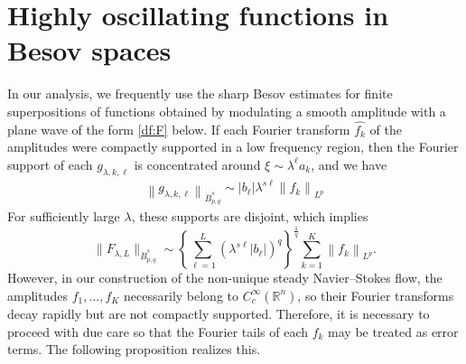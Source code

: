 \documentclass[a4paper,12pt,reqno]{amsart}
\theoremstyle{plain}
\theoremstyle{definition}
\newcommand{\dB}{\dot{B}}
\newcommand{\n}[1]{{\left\|#1\right\|}}
\newcommand{\Mp}[1]{\left\{#1\right\}}
\renewcommand{\sp}[1]{\left(#1\right)}
\begin{document}
\section{Highly oscillating functions in Besov spaces}\label{sec:osc}
In our analysis, we frequently use the sharp Besov estimates for finite superpositions of functions obtained by
modulating a smooth amplitude with a plane wave of the form \eqref{df:F} below.
If each Fourier transform $\widehat{f_k}$ of the amplitudes were compactly supported in a low frequency region, then the Fourier support of each $g_{\lambda,k,\ell}$ is concentrated around $\xi \sim \lambda^\ell a_k$, and we have 
\begin{align}
    \n{g_{\lambda,k,\ell}}_{\dB_{p,q}^s} \sim |b_\ell|\lambda^{s\ell}\n{f_k}_{L^p}
\end{align}
For sufficiently large $\lambda$,
these supports are disjoint,
which implies
\begin{equation}\label{eq:heuristic-superposition}
  \|F_{\lambda,L}\|_{\dot B^{s}_{p,q}}
  \sim
  \Mp{\sum_{\ell=1}^L \sp{\lambda^{s \ell}|b_\ell|}^q}^{\frac{1}{q}}
  \sum_{k=1}^K\n{f_k}_{L^p}.
\end{equation}
However, in our construction of the non-unique steady Navier--Stokes flow, 
the amplitudes $f_1,\dots,f_K$ necessarily belong to $C_c^\infty(\mathbb{R}^n)$, 
so their Fourier transforms decay rapidly but are not
compactly supported. 
Therefore, it is necessary to proceed with due care so that the Fourier tails of each $f_k$ may be treated as error terms. The following proposition realizes this.
\end{document}
